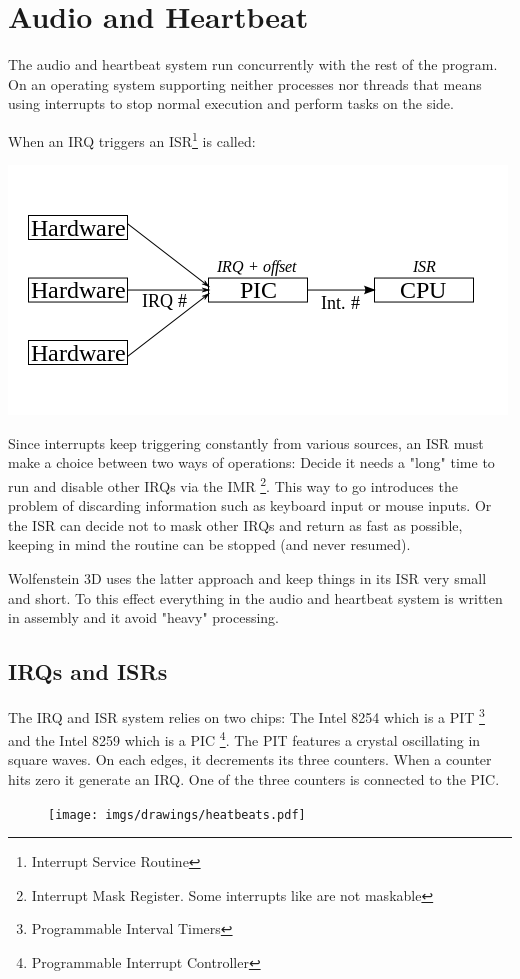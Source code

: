 \section{Audio and Heartbeat}
The audio and heartbeat system run concurrently with the rest of the program. On an operating system supporting neither processes nor threads that means using interrupts to stop normal execution and perform tasks on the side.\\
\par
When an IRQ triggers an ISR\footnote{Interrupt Service Routine} is called:

\includegraphics[width=.9\textwidth]{imgs/drawings/irqs/explanation.png}
\par
 Since interrupts keep triggering constantly from various sources, an ISR must make a choice between two ways of operations: Decide it needs a "long" time to run and disable other IRQs via the IMR \footnote{Interrupt Mask Register. Some interrupts like are not maskable}. This way to go introduces the problem of discarding information such as keyboard input or mouse inputs. Or the ISR can decide not to mask other IRQs and return as fast as possible, keeping in mind the routine can be stopped (and never resumed).\\
 \par
 Wolfenstein 3D uses the latter approach and keep things in its ISR very small and short. To this effect everything in the audio and heartbeat system is written in assembly and it avoid "heavy" processing.

\subsection{IRQs and ISRs}
The IRQ and ISR system relies on two chips: The Intel 8254 which is a PIT \footnote{Programmable Interval Timers} and the Intel 8259 which is a PIC \footnote{Programmable Interrupt Controller}. The PIT features a crystal oscillating in square waves. On each edges, it decrements its three counters. When a counter hits zero it generate an IRQ. One of the three counters is connected to the PIC. 
\par
\begin{figure}[H]
\centering
 \texttt{[image: imgs/drawings/heatbeats.pdf]}
 \end{figure}
\par

